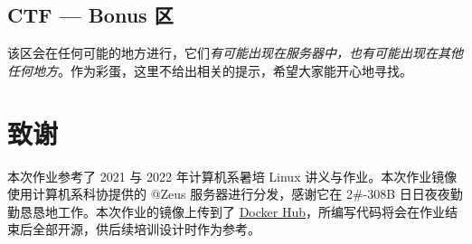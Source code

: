 \documentclass{article}
\begin{document}
	\subsection{CTF --- Bonus 区}

	该区会在任何可能的地方进行，它们\textit{有可能出现在服务器中，也有可能出现在其他任何地方}。作为彩蛋，这里不给出相关的提示，希望大家能开心地寻找。

	\section{致谢}

	本次作业参考了 2021 与 2022 年计算机系暑培 Linux 讲义与作业\cite{sast2022-linux}。本次作业镜像使用计算机系科协提供的 @Zeus 服务器进行分发，感谢它在 2\#-308B 日日夜夜勤勤恳恳地工作。本次作业的镜像上传到了 \href{https://hub.docker.com/r/jkjkmxmx/sast2023-linux-git}{Docker Hub}，所编写代码将会在作业结束后全部开源，供后续培训设计时作为参考。

	
	
\end{document}
